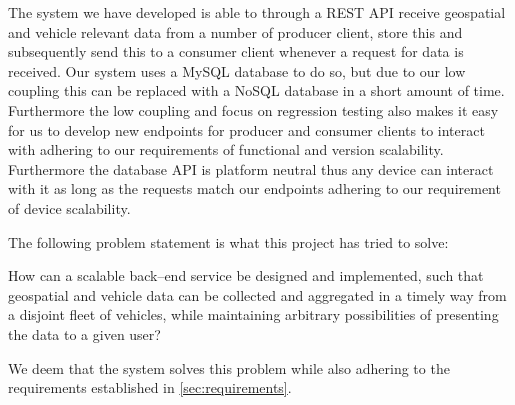 \bigskip \noindent
The system we have developed is able to through a REST API receive geospatial and vehicle relevant data from a number of producer client, store this and subsequently send this to a consumer client whenever a request for data is received.
Our system uses a MySQL database to do so, but due to our low coupling this can be replaced with a NoSQL database in a short amount of time.
Furthermore the low coupling and focus on regression testing also makes it easy for us to develop new endpoints for producer and consumer clients to interact with adhering to our requirements of functional and version scalability.
Furthermore the database API is platform neutral thus any device can interact with it as long as the requests match our endpoints adhering to our requirement of device scalability.

The following problem statement is what this project has tried to solve:

\medskip
{\addtolength{\leftskip}{10mm}\addtolength{\rightskip}{10mm}\noindent\hrulefill\it

\noindent How can a scalable back--end service be designed and implemented,
such that geospatial and vehicle data can be collected and aggregated in a timely way from a disjoint fleet of vehicles,
while maintaining arbitrary possibilities of presenting the data to a given user?

\noindent\hrulefill

}
We deem that the system solves this problem while also adhering to the requirements established in \cref{sec:requirements}.
